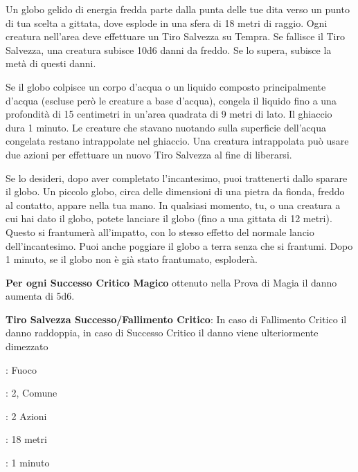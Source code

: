 \begin{multicols}{2}
Un globo gelido di energia fredda parte dalla punta delle tue dita verso un punto di tua scelta a gittata, dove esplode in una sfera di 18 metri di raggio. Ogni creatura nell'area deve effettuare un Tiro Salvezza su Tempra. Se fallisce il Tiro Salvezza, una creatura subisce 10d6 danni da freddo. Se lo supera, subisce la metà di questi danni.

Se il globo colpisce un corpo d'acqua o un liquido composto principalmente d'acqua (escluse però le creature a base d'acqua), congela il liquido fino a una profondità di 15 centimetri in un'area quadrata di 9 metri di lato. Il ghiaccio dura 1 minuto. Le creature che stavano nuotando sulla superficie dell'acqua congelata restano intrappolate nel ghiaccio. Una creatura intrappolata può usare due azioni per effettuare un nuovo Tiro Salvezza al fine di liberarsi.

Se lo desideri, dopo aver completato l'incantesimo, puoi trattenerti dallo sparare il globo. Un piccolo globo, circa delle dimensioni di una pietra da fionda, freddo al contatto, appare nella tua mano. In qualsiasi momento, tu, o una creatura a cui hai dato il globo, potete lanciare il globo (fino a una gittata di 12 metri). Questo si frantumerà all'impatto, con lo stesso effetto del normale lancio dell'incantesimo. Puoi anche poggiare il globo a terra senza che si frantumi. Dopo 1 minuto, se il globo non è già stato frantumato, esploderà.

\textbf{Per ogni Successo Critico Magico} ottenuto nella Prova di Magia il danno aumenta di 5d6.

\textbf{Tiro Salvezza Successo/Fallimento Critico}: In caso di Fallimento Critico il danno raddoppia, in caso di Successo Critico il danno viene ulteriormente dimezzato

\noindent\colorbox{OBSSgold!10}{
\begin{minipage}{0.95\linewidth}
\begin{description}[noitemsep, topsep=0pt, parsep=0pt, partopsep=0pt, leftmargin=0cm, labelwidth=1.3cm]
	\item[\textbf{Lista}]: Fuoco
	\item[\textbf{Livello}]: 2, Comune
	\item[\textbf{Lancio}]: 2 Azioni
	\item[\textbf{Gittata}]: 18 metri
	\item[\textbf{Durata}]: 1 minuto
\end{description}
\end{minipage}}\smallskip


\end{multicols}
